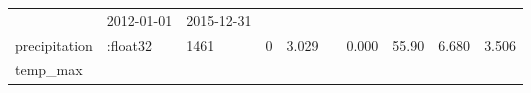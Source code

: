 \documentclass[]{article}
\begin{document}
\begin{longtable}[]{@{}llllllllll@{}}
\begin{minipage}[t]{0.04\columnwidth}
\strut
\end{minipage} & \begin{minipage}[t]{0.07\columnwidth}\raggedright\strut
2012-01-01\strut
\end{minipage} & \begin{minipage}[t]{0.07\columnwidth}\raggedright\strut
2015-12-31\strut
\end{minipage} & \begin{minipage}[t]{0.12\columnwidth}\raggedright\strut
\strut
\end{minipage} & \begin{minipage}[t]{0.05\columnwidth}\raggedright\strut
\strut
\end{minipage}\tabularnewline
\begin{minipage}[t]{0.08\columnwidth}\raggedright\strut
precipitation\strut
\end{minipage} & \begin{minipage}[t]{0.11\columnwidth}\raggedright\strut
:float32\strut
\end{minipage} & \begin{minipage}[t]{0.06\columnwidth}\raggedright\strut
1461\strut
\end{minipage} & \begin{minipage}[t]{0.07\columnwidth}\raggedright\strut
0\strut
\end{minipage} & \begin{minipage}[t]{0.07\columnwidth}\raggedright\strut
3.029\strut
\end{minipage} & \begin{minipage}[t]{0.04\columnwidth}\raggedright\strut
\strut
\end{minipage} & \begin{minipage}[t]{0.07\columnwidth}\raggedright\strut
0.000\strut
\end{minipage} & \begin{minipage}[t]{0.07\columnwidth}\raggedright\strut
55.90\strut
\end{minipage} & \begin{minipage}[t]{0.12\columnwidth}\raggedright\strut
6.680\strut
\end{minipage} & \begin{minipage}[t]{0.05\columnwidth}\raggedright\strut
3.506\strut
\end{minipage}\tabularnewline
\begin{minipage}[t]{0.08\columnwidth}\raggedright\strut
temp\_max\strut
\end{minipage} & \begin{minipage}[t]{0.11\columnwidth}\raggedright\strut

\end{minipage}
\end{longtable}
\end{document}
